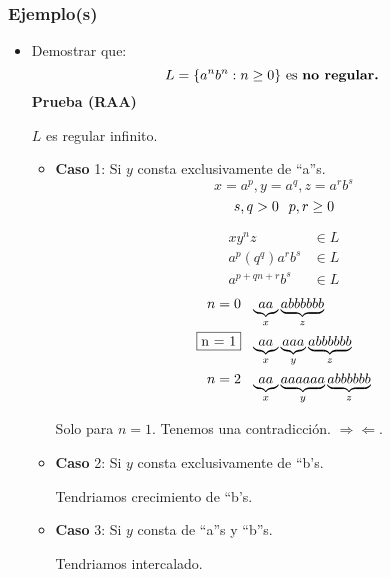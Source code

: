 \subsubsection{Ejemplo(s)}
\begin{itemize}
\item Demostrar que:
	$$
	L =\{ a^n b^n : n\geq 0 \} \text{ es \textbf{no regular.}}
	$$
\textbf{Prueba (RAA)}	
\begin{center}
$L$ es regular infinito.
\end{center}
\begin{itemize}
\item \textbf{Caso} 1: Si $y$ consta exclusivamente de ``a''s.
$$x=a^p , y=a^q , z=a^r b^s$$
$$s,q >0 \hspace{0.25cm} p,r\geq 0$$
\begin{multicols}{2}
\begin{align*}
xy^n z & \in L \\
a^p(q^q)a^r b^s & \in L \\
a^{p+qn+r} b^s & \in L
\end{align*}
\columnbreak
\begin{align*}
n = 0 & \hspace{0.25cm} \underbrace{aa}_x \underbrace{abbbbbb}_z \\
\fbox{n = 1} & \hspace{0.25cm} \underbrace{aa}_x \underbrace{aaa}_y \underbrace{abbbbbb}_z \\
n = 2 & \hspace{0.25cm} \underbrace{aa}_x \underbrace{aaaaaa}_y \underbrace{abbbbbb}_z
\end{align*}
\end{multicols}

Solo para $n=1$. Tenemos una contradicción. $\Rightarrow\Leftarrow$.



\item \textbf{Caso} 2: Si $y$ consta exclusivamente de ``b's.
\begin{center}
Tendriamos crecimiento de ``b's.
\end{center}
\item \textbf{Caso} 3: Si $y$ consta de ``a''s y ``b''s.
\begin{center}
Tendriamos intercalado.
\end{center}


\end{itemize}
\end{itemize}

